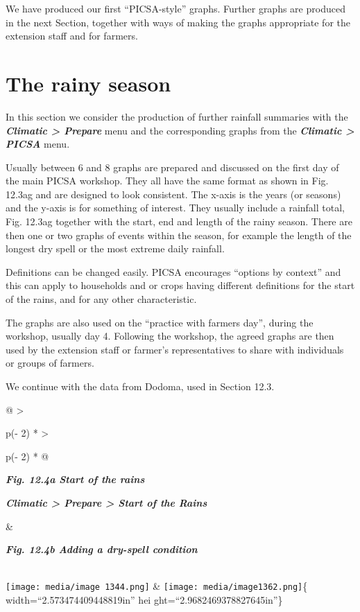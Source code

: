 \documentclass[
  letterpaper,
  DIV=11,
  numbers=noendperiod]{scrreprt}
\begin{document}
We have produced our first ``PICSA-style'' graphs. Further graphs are
produced in the next Section, together with ways of making the graphs
appropriate for the extension staff and for farmers.

\section{The rainy season}\label{the-rainy-season}

In this section we consider the production of further rainfall summaries
with the \textbf{\emph{Climatic \textgreater{} Prepare}} menu and the
corresponding graphs from the \textbf{\emph{Climatic \textgreater{}
PICSA}} menu.

Usually between 6 and 8 graphs are prepared and discussed on the first
day of the main PICSA workshop. They all have the same format as shown
in Fig. 12.3ag and are designed to look consistent. The x-axis is the
years (or seasons) and the y-axis is for something of interest. They
usually include a rainfall total, Fig. 12.3ag together with the start,
end and length of the rainy season. There are then one or two graphs of
events within the season, for example the length of the longest dry
spell or the most extreme daily rainfall.

Definitions can be changed easily. PICSA encourages ``options by
context'' and this can apply to households and or crops having different
definitions for the start of the rains, and for any other
characteristic.

The graphs are also used on the ``practice with farmers day'', during
the workshop, usually day 4. Following the workshop, the agreed graphs
are then used by the extension staff or farmer's representatives to
share with individuals or groups of farmers.

We continue with the data from Dodoma, used in Section 12.3.

\begin{longtable}[]{@{}
  >{\raggedright\arraybackslash}p{(\columnwidth - 2\tabcolsep) * }
  >{\raggedright\arraybackslash}p{(\columnwidth - 2\tabcolsep) * }@{}}
\toprule\noalign{}
\begin{minipage}[b]{\linewidth}\raggedright
\textbf{\emph{Fig. 12.4a Start of the rains}}

\textbf{\emph{Climatic \textgreater{} Prepare \textgreater{} Start of
the Rains}}
\end{minipage} & \begin{minipage}[b]{\linewidth}\raggedright
\textbf{\emph{Fig. 12.4b Adding a dry-spell condition}}
\end{minipage} \\
\midrule\noalign{}
\endhead
\bottomrule\noalign{}
\endlastfoot
\texttt{[image: media/image 1344.png]}
& \texttt{[image: media/image1362.png]}\{ width=``2.573474409448819in''
hei ght=``2.9682469378827645in''\} \\
\end{longtable}
\end{document}
